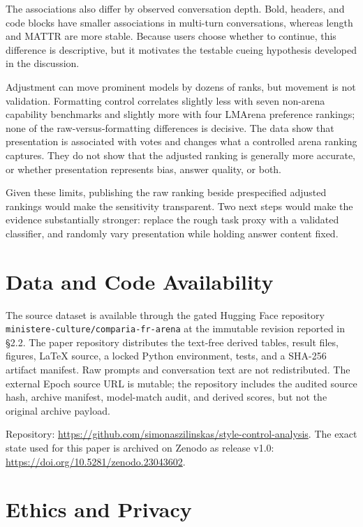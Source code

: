 \documentclass[
]{article}
\newcounter{none} %
\begin{document}
The associations also differ by observed conversation depth. Bold,
headers, and code blocks have smaller associations in multi-turn
conversations, whereas length and MATTR are more stable. Because users
choose whether to continue, this difference is descriptive, but it
motivates the testable cueing hypothesis developed in the discussion.

Adjustment can move prominent models by dozens of ranks, but movement is
not validation. Formatting control correlates slightly less with seven
non-arena capability benchmarks and slightly more with four LMArena
preference rankings; none of the raw-versus-formatting differences is
decisive. The data show that presentation is associated with votes and
changes what a controlled arena ranking captures. They do not show that
the adjusted ranking is generally more
accurate, or whether presentation represents bias, answer quality, or
both.

Given these limits, publishing the raw ranking beside prespecified
adjusted rankings would make the sensitivity transparent. Two next
steps would make the evidence substantially
stronger: replace the rough task proxy with a validated classifier, and
randomly vary presentation while holding answer content fixed.

\section*{Data and Code Availability}\label{data-and-code-availability}

The source dataset is available through the gated Hugging Face
repository \nolinkurl{ministere-culture/comparia-fr-arena} at the
immutable revision reported in §2.2. The paper repository distributes the
text-free derived tables, result files, figures, LaTeX source, a locked
Python environment, tests, and a SHA-256 artifact manifest. Raw prompts
and conversation text are not redistributed. The external Epoch source
URL is mutable; the repository includes the audited source hash, archive
manifest, model-match audit, and derived scores, but not the original
archive payload.

Repository: \url{https://github.com/simonaszilinskas/style-control-analysis}.
The exact state used for this paper is archived on Zenodo as release v1.0:
\url{https://doi.org/10.5281/zenodo.23043602}.

\section*{Ethics and Privacy}\label{ethics-and-privacy}
\end{document}
